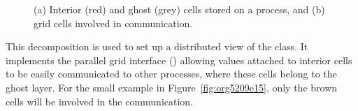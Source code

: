 \begin{figure}
\centering
  \caption{(a) Interior (red) and ghost (grey) cells stored on a process, and
  (b) grid cells involved in communication.
  }
\end{figure}

This decomposition is used to set up a distributed view of the 
 class. It implements the parallel \dune grid interface 
(\cite{dunepaperI:08,dunepaperII:08}) allowing values attached to interior cells
to be easily communicated to other
processes, where these cells belong to the ghost layer. 
For the small example in Figure~\ref{fig:org5209e15}, only the brown cells will be
involved in the communication.



